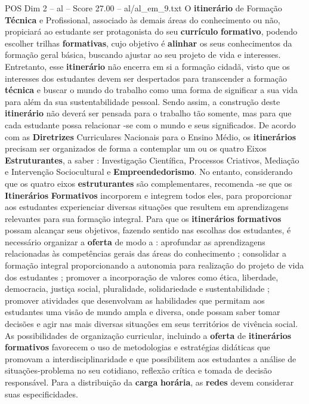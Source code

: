\begin{textsample}{POS Dim 2 – al – Score 27.00 – al/al\_em\_9.txt}
O \textbf{itinerário} de Formação \textbf{Técnica} e Profissional, associado às demais áreas do conhecimento ou não, propiciará ao estudante ser protagonista do seu \textbf{currículo} \textbf{formativo}, podendo escolher trilhas \textbf{formativas}, cujo objetivo é \textbf{alinhar} os seus conhecimentos da formação geral básica, buscando ajustar ao seu projeto de vida e interesses.
Entretanto, esse \textbf{itinerário} não encerra em si a formação cidadã, visto que os interesses dos estudantes devem ser despertados para transcender a formação \textbf{técnica} e buscar o mundo do trabalho como uma forma de significar a sua vida para além da sua sustentabilidade pessoal.
Sendo assim, a construção deste \textbf{itinerário} não deverá ser pensada para o trabalho tão somente, mas para que cada estudante possa relacionar -se com o mundo e seus significados.
De acordo com as \textbf{Diretrizes} Curriculares Nacionais para o Ensino Médio, os \textbf{itinerários} precisam ser organizados de forma a contemplar um ou os quatro Eixos \textbf{Estruturantes}, a saber : Investigação Científica, Processos Criativos, Mediação e Intervenção Sociocultural e \textbf{Empreendedorismo}.
No entanto, considerando que os quatro eixos \textbf{estruturantes} são complementares, recomenda -se que os \textbf{Itinerários} \textbf{Formativos} incorporem e integrem todos eles, para proporcionar aos estudantes experienciar diversas situações que resultem em aprendizagens relevantes para sua formação integral.
Para que os \textbf{itinerários} \textbf{formativos} possam alcançar seus objetivos, fazendo sentido nas escolhas dos estudantes, é necessário organizar a \textbf{oferta} de modo a : aprofundar as aprendizagens relacionadas às competências gerais das áreas do conhecimento ; consolidar a formação integral proporcionando a autonomia para realização do projeto de vida dos estudantes ; promover a incorporação de valores como ética, liberdade, democracia, justiça social, pluralidade, solidariedade e sustentabilidade ; promover atividades que desenvolvam as habilidades que permitam aos estudantes uma visão de mundo ampla e diversa, onde possam saber tomar decisões e agir nas mais diversas situações em seus territórios de vivência social.
As possibilidades de organização curricular, incluindo a \textbf{oferta} de \textbf{itinerários} \textbf{formativos} favorecem o uso de metodologias e estratégias didáticas que promovam a interdisciplinaridade e que possibilitem aos estudantes a análise de situações-problema no seu cotidiano, reflexão crítica e tomada de decisão responsável.
Para a distribuição da \textbf{carga} \textbf{horária}, as \textbf{redes} devem considerar suas especificidades.

\end{textsample}
